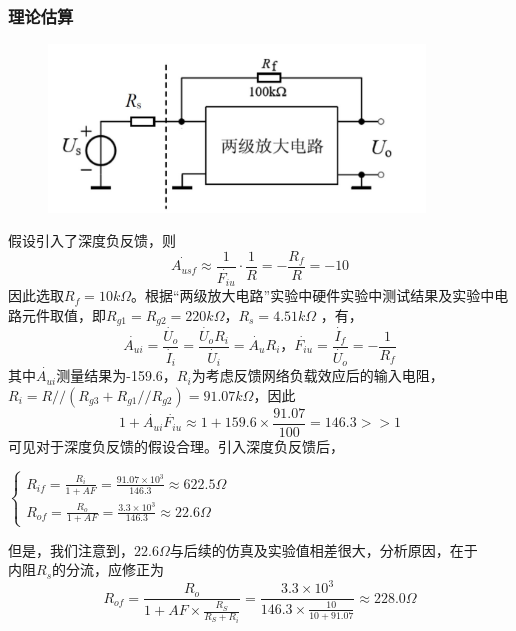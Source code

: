 \documentclass[12pt,a4paper]{article}
\begin{document}
\begin{spacing}{1.3}
\subsubsection{理论估算}
\begin{figure}[H]
\centering
\includegraphics[width=10cm]{1.jpg}
\end{figure}
假设引入了深度负反馈，则
\[
\dot{A_{usf}} \approx \frac{1}{\dot{F_{iu}}} \cdot \frac{1}{R} = - \frac{R_f}{R} = -10
\]
因此选取$R_f = 10k\Omega$。根据“两级放大电路”实验中硬件实验中测试结果及实验中电路元件取值，即$R_{g1} = R_{g2} = 220k\Omega， R_s = 4.51k\Omega$ ，有，
\[
\dot{A_{ui}} = \frac{\dot{U_o}}{\dot{I_i}} = \frac{\dot{U_o} R_{i}}{\dot{U_i}} = \dot{A_u} R_{i}，\dot{F_{iu}} = \frac{\dot{I_f}}{\dot{U_o}} = - \frac{1}{R_f}
\]
其中$\dot{A_{ui}}$测量结果为-159.6，$R_{i}$为考虑反馈网络负载效应后的输入电阻，$R_{i} = R // (R_{g3} + R_{g1} // R_{g2}) = 91.07k\Omega$，因此
\[
1 + \dot{A_{ui}} \dot{F_{iu}} \approx 1 + 159.6 \times \frac{91.07}{100} = 146.3 >> 1
\]
可见对于深度负反馈的假设合理。引入深度负反馈后，
\begin{center}
$\begin{cases}
R_{if} = \frac{R_i}{1 + AF}  = \frac{91.07 \times 10^3}{146.3} \approx 622.5\Omega\\
R_{of} = \frac{R_o}{1 + AF} = \frac{3.3 \times 10^3}{146.3} \approx 22.6\Omega
\end{cases}$
\end{center}
但是，我们注意到，$22.6\Omega$与后续的仿真及实验值相差很大，分析原因，在于$内阻R_s$的分流，应修正为
\[
R_{of} = \frac{R_o}{1 + AF \times \frac{R_S}{R_S+R_i}} = \frac{3.3 \times 10^3}{146.3\times \frac{10}{10+91.07}} \approx 228.0\Omega
\]


\end{spacing}
\end{document}
